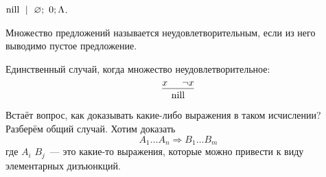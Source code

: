 \documentclass[main]{subfiles}
\begin{document}
\begin{definition}
    $\mathrm{nill}\ \mid \ \varnothing; \ 0; \Lambda$.
\end{definition}
\begin{definition}
    Множество предложений называется неудовлетворительным, если из него выводимо пустое предложение.
\end{definition}
\begin{remark}
    Единственный случай, когда множество неудовлетворительное:
    \begin{gather*}
        \begin{prooftree}
            \hypo{x}
            \hypo{\lnot x}
            \infer2{\nill}
        \end{prooftree}
    \end{gather*}
\end{remark}
Встаёт вопрос, как доказывать какие-либо выражения в таком исчислении? Разберём общий случай. Хотим доказать
\[A_1 \dots A_n \Rightarrow B_1 \dots B_m \tag{*}\]
где $A_i$ $B_j$~--- это какие-то выражения, которые можно привести к виду элементарных дизъюнкций.
\end{document}
